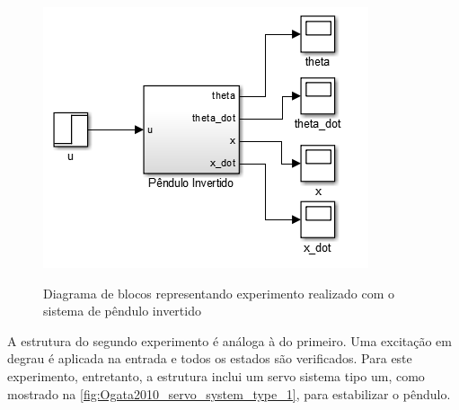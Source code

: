 \begin{figure}[!htb]
    \centering
    \caption{Diagrama de blocos representando experimento realizado com o sistema de pêndulo invertido}
    \includegraphics[width=.6\textwidth]{./04-figuras/simulink_pendulo/diagrama_step_u}
    \label{fig:simulink-pendulo-diagrama-geral-step}
\end{figure}

A estrutura do segundo experimento é análoga à do primeiro. Uma excitação em degrau é aplicada na entrada e todos os estados são verificados. Para este experimento, entretanto, a estrutura inclui um servo sistema tipo um, como mostrado na \autoref{fig:Ogata2010_servo_system_type_1},  para estabilizar o pêndulo.
